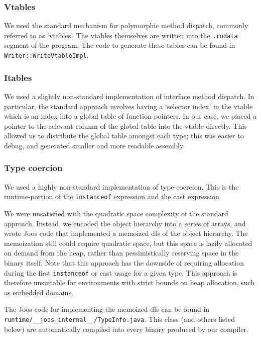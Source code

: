 \documentclass[12pt, titlepage]{article}
\newcommand{\z}[1]{\texttt{#1}}
\begin{document}
\subsubsection{Vtables}\label{subsubsec:vtables}
We used the standard mechanism for polymorphic method dispatch, commonly
referred to as `vtables'. The vtables themselves are written into the
\z{.rodata} segment of the program. The code to generate these tables can be
found in \z{Writer::WriteVtableImpl}.

\subsubsection{Itables}\label{subsubsec:itables}
We used a slightly non-standard implementation of interface method dispatch. In
particular, the standard approach involves having a `selector index' in the
vtable which is an index into a global table of function pointers. In our case,
we placed a pointer to the relevant column of the global table into the vtable
directly. This allowed us to distribute the global table amongst each type;
this was easier to debug, and generated smaller and more readable assembly.

\subsubsection{Type coercion}\label{subsubsec:co}
We used a highly non-standard implementation of type-coercion. This is the
runtime-portion of the \z{instanceof} expression and the cast expression.

We were unsatisfied with the quadratic space complexity of the standard
approach. Instead, we encoded the object hierarchy into a series of arrays, and
wrote Joos code that implemented a memoized \ac{dfs} of the object hierarchy.
The memoization still could require quadratic space, but this space is lazily
allocated on demand from the heap, rather than pessimistically reserving space
in the binary itself. Note that this approach has the downside of requiring
allocation during the first \z{instanceof} or cast usage for a given type. This
approach is therefore unsuitable for environments with strict bounds on heap
allocation, such as embedded domains.

The Joos code for implementing the memoized \ac{dfs} can be found in
\\\z{runtime/\_\_joos\_internal\_\_/TypeInfo.java}. This class (and others
listed below) are automatically compiled into every binary produced by our
compiler.
\end{document}
